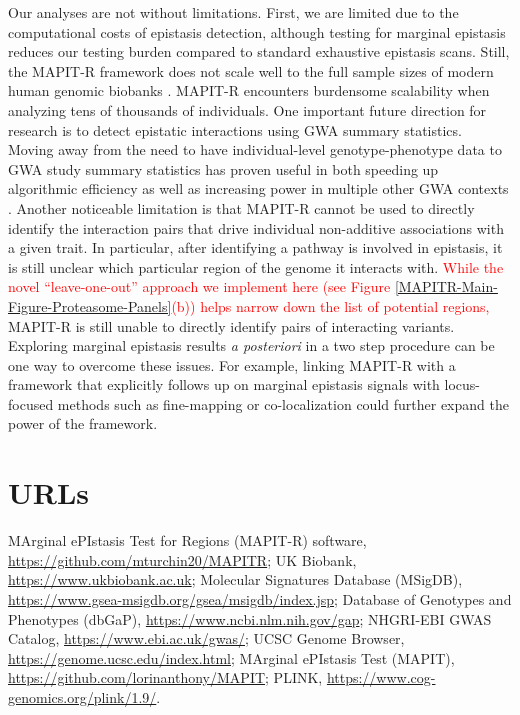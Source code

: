 \documentclass[10pt]{article}
\begin{document}
Our analyses are not without limitations. First, we are limited due to the computational costs of epistasis detection, although testing for marginal epistasis reduces our testing burden compared to standard exhaustive epistasis scans. Still, the MAPIT-R framework does not scale well to the full sample sizes of modern human genomic biobanks \cite{Crawford2017a,Crawford2018a,Moore2019}. MAPIT-R encounters burdensome scalability when analyzing tens of thousands of individuals. One important future direction for research is to detect epistatic interactions using GWA summary statistics. Moving away from the need to have individual-level genotype-phenotype data to GWA study summary statistics has proven useful in both speeding up algorithmic efficiency as well as increasing power in multiple other GWA contexts \cite{Shi2016,Johnson2018,Ray2018,Turchin2019,Urbut2019,Cheng2020}. Another noticeable limitation is that MAPIT-R cannot be used to directly identify the interaction pairs that drive individual non-additive associations with a given trait. In particular, after identifying a pathway is involved in epistasis, it is still unclear which particular region of the genome it interacts with. \textcolor{red}{While the novel ``leave-one-out'' approach we implement here (see Figure \ref{MAPITR-Main-Figure-Proteasome-Panels}(b)) helps narrow down the list of potential regions,} MAPIT-R is still unable to directly identify pairs of interacting variants. Exploring marginal epistasis results \textit{a posteriori} in a two step procedure can be one way to overcome these issues. For example, linking MAPIT-R with a framework that explicitly follows up on marginal epistasis signals with locus-focused methods such as fine-mapping \cite{Kichaev2014,Chen2015,Benner2016} or co-localization \cite{Hormozdiari2016,Zhu2016,Wen2017,Giambartolomei2018,Wallace2020} could further expand the power of the framework. 


\section*{URLs}\label{MAPITR-URLs}

MArginal ePIstasis Test for Regions (MAPIT-R) software, \url{https://github.com/mturchin20/MAPITR}; UK Biobank, \url{https://www.ukbiobank.ac.uk}; Molecular Signatures Database (MSigDB), \url{https://www.gsea-msigdb.org/gsea/msigdb/index.jsp}; Database of Genotypes and Phenotypes (dbGaP), \url{https://www.ncbi.nlm.nih.gov/gap}; NHGRI-EBI GWAS Catalog, \url{https://www.ebi.ac.uk/gwas/}; UCSC Genome Browser, \url{https://genome.ucsc.edu/index.html}; MArginal ePIstasis Test (MAPIT), \url{https://github.com/lorinanthony/MAPIT}; PLINK, \url{https://www.cog-genomics.org/plink/1.9/}.
\end{document}

